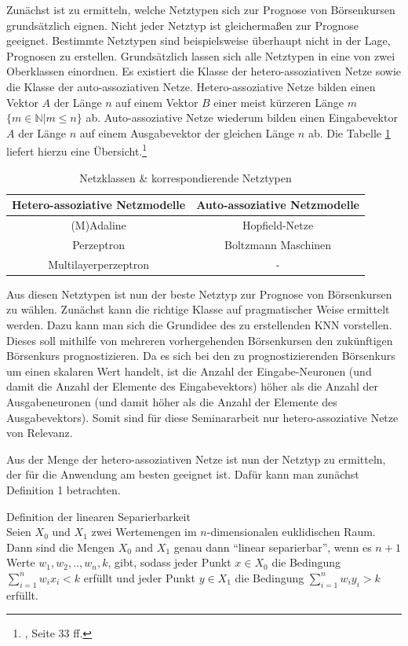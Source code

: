 Zunächst ist zu ermitteln, welche Netztypen sich zur Prognose von Börsenkursen grundsätzlich eignen. Nicht jeder Netztyp ist gleichermaßen zur Prognose geeignet. Bestimmte Netztypen sind beispielsweise überhaupt nicht in der Lage, Prognosen zu erstellen. Grundsätzlich lassen sich alle Netztypen in eine von zwei Oberklassen einordnen. Es existiert die Klasse der hetero-assoziativen Netze sowie die Klasse der auto-assoziativen Netze. Hetero-assoziative Netze bilden einen Vektor $A$ der Länge $n$ auf einem Vektor $B$ einer meist kürzeren Länge $m$ $\{m \in \mathbb{N} | m \le n\}$ ab. Auto-assoziative Netze wiederum bilden einen Eingabevektor $A$ der Länge $n$ auf einem Ausgabevektor der gleichen Länge $n$ ab. Die Tabelle \ref{tab:Netztypen} liefert hierzu eine Übersicht.\footnote{\Vgl{}, Seite 33 ff.}

\begin{table}[H]
\centering
\begin{tabular}{|c|c|}
\hline 
\textbf{Hetero-assoziative Netzmodelle} & \textbf{Auto-assoziative Netzmodelle} \\ 
\hline 
(M)Adaline & Hopfield-Netze \\ 
\hline  
Perzeptron &  Boltzmann Maschinen \\ 
\hline 
Multilayerperzeptron & - \\ 
\hline 
\end{tabular} 
\label{tab:Netztypen}
\caption{Netzklassen \& korrespondierende Netztypen}
\end{table}

Aus diesen Netztypen ist nun der beste Netztyp zur Prognose von Börsenkursen zu wählen. Zunächst kann die richtige Klasse auf pragmatischer Weise ermittelt werden. Dazu kann man sich die Grundidee des zu erstellenden KNN vorstellen. Dieses soll mithilfe von mehreren vorhergehenden Börsenkursen den zukünftigen Börsenkurs prognostizieren. Da es sich bei den zu prognostizierenden Börsenkurs um einen skalaren Wert handelt, ist die Anzahl der Eingabe-Neuronen (und damit die Anzahl der Elemente des Eingabevektors) höher als die Anzahl der Ausgabeneuronen (und damit höher als die Anzahl der Elemente des Ausgabevektors). Somit sind für diese Seminararbeit nur hetero-assoziative Netze von Relevanz.

Aus der Menge der hetero-assoziativen Netze ist nun der Netztyp zu ermitteln, der für die Anwendung am besten geeignet ist. Dafür kann man zunächst Definition 1 betrachten.

\begin{defi}Definition der linearen Separierbarkeit\\
Seien $X_{0}$ und $X_{1}$ zwei Wertemengen im $n$-dimensionalen euklidischen Raum. Dann sind die Mengen $X_{0}$ and $X_{1}$ genau dann  "`linear separierbar"', wenn es  $n+1$ Werte $w_{1}, w_{2},..,w_{n}, k$, gibt, sodass jeder Punkt  $x \in X_{0}$ die Bedingung $\sum^{n}_{i=1} w_{i}x_{i} < k$ erfüllt und jeder Punkt $y \in X_{1}$ die Bedingung $\sum^{n}_{i=1} w_{i}y_{i} > k$ erfüllt.
\end{defi}

